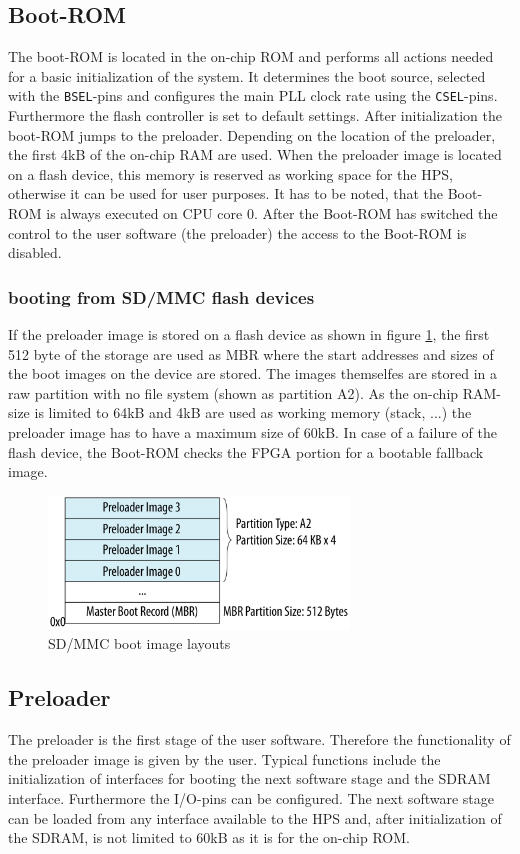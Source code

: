 \subsection{Boot-ROM}
The boot-ROM is located in the on-chip ROM and performs all actions needed for a basic initialization of the system. It determines the boot source, selected with the \texttt{BSEL}-pins and configures the main PLL clock rate using the \texttt{CSEL}-pins. Furthermore the flash controller is set to default settings. After initialization the boot-ROM jumps to the preloader. Depending on the location of the preloader, the first 4kB of the on-chip RAM are used. When the preloader image is located on a flash device, this memory is reserved as working space for the HPS, otherwise it can be used for user purposes. It has to be noted, that the Boot-ROM is always executed on CPU core 0. After the Boot-ROM has switched the control to the user software (the preloader) the access to the Boot-ROM is disabled.
\subsubsection{booting from SD/MMC flash devices}
If the preloader image is stored on a flash device as shown in figure \ref{fig:sdboot}, the first 512 byte of the storage are used as MBR where the start addresses and sizes of the boot images on the device are stored. The images themselfes are stored in a raw partition with no file system (shown as partition A2). As the on-chip RAM-size is limited to 64kB and 4kB are used as working memory (stack, ...) the preloader image has to have a maximum size of 60kB. In case of a failure of the flash device, the Boot-ROM checks the FPGA portion for a bootable fallback image. 
\begin{figure}[htbp]
\begin{center}
\includegraphics[width=8cm,keepaspectratio=true]{bilder/png/sdboot}
\caption{SD/MMC boot image layouts\cite[chapter A]{AlteraHPS15}}
\label{fig:sdboot}
\end{center}
\end{figure}
\subsection{Preloader}
The preloader is the first stage of the user software. Therefore the functionality of the preloader image is given by the user. Typical functions include the initialization of interfaces for booting the next software stage and the SDRAM interface. Furthermore the I/O-pins can be configured. The next software stage can be loaded from any interface available to the HPS and, after initialization of the SDRAM, is not limited to 60kB as it is for the on-chip ROM.
